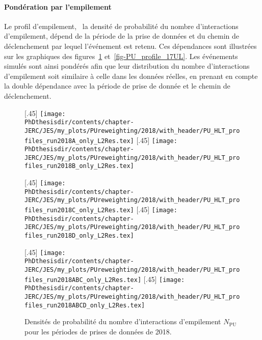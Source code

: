\paragraph{Pondération par l'empilement}
Le profil d'empilement, \ie\ la densité de probabilité du nombre d'interactions d'empilement, dépend de la période de la prise de données et du chemin de déclenchement par lequel l'événement est retenu. Ces dépendances sont illustrées sur les graphiques des figures~\ref{fig-PU_profile_18} et~\ref{fig-PU_profile_17UL}.
Les événements simulés sont ainsi pondérés afin que leur distribution du nombre d'interactions d'empilement soit similaire à celle dans les données réelles, en prenant en compte la double dépendance avec la période de prise de donnée et le chemin de déclenchement.
\begin{figure}[p]
\centering
{}[.45\textwidth]
{\texttt{[image: \\PhDthesisdir/contents/chapter-JERC/JES/my\_plots/PUreweighting/2018/with\_header/PU\_HLT\_profiles\_run2018A\_only\_L2Res.tex]}}
\hfill
{}[.45\textwidth]
{\texttt{[image: \\PhDthesisdir/contents/chapter-JERC/JES/my\_plots/PUreweighting/2018/with\_header/PU\_HLT\_profiles\_run2018B\_only\_L2Res.tex]}}

\vfill

[.45\textwidth]
{\texttt{[image: \\PhDthesisdir/contents/chapter-JERC/JES/my\_plots/PUreweighting/2018/with\_header/PU\_HLT\_profiles\_run2018C\_only\_L2Res.tex]}}
\hfill
{}[.45\textwidth]
{\texttt{[image: \\PhDthesisdir/contents/chapter-JERC/JES/my\_plots/PUreweighting/2018/with\_header/PU\_HLT\_profiles\_run2018D\_only\_L2Res.tex]}}

\vfill

[.45\textwidth]
{\texttt{[image: \\PhDthesisdir/contents/chapter-JERC/JES/my\_plots/PUreweighting/2018/with\_header/PU\_HLT\_profiles\_run2018ABC\_only\_L2Res.tex]}}
\hfill
{}[.45\textwidth]
{\texttt{[image: \\PhDthesisdir/contents/chapter-JERC/JES/my\_plots/PUreweighting/2018/with\_header/PU\_HLT\_profiles\_run2018ABCD\_only\_L2Res.tex]}}

\caption[Densités de probabilité de $N_\text{PU}$ pour 2018.]{Densités de probabilité du nombre d'interactions d'empilement $N_\text{PU}$ pour les périodes de prises de données de 2018.}
\label{fig-PU_profile_18}
\end{figure}
